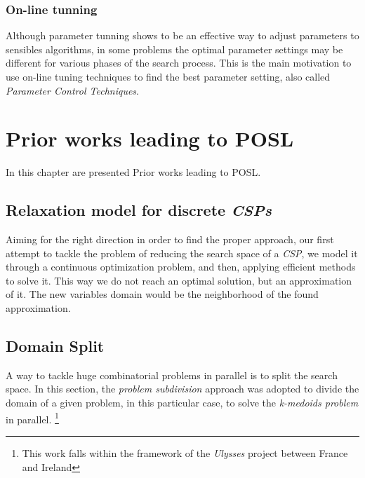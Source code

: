 \documentclass[a4paper]{book} %
\newcommand{\posl}{{\sc POSL}}
\newcommand{\csp}{\textit{CSP}}
\newcommand{\csps}{\csp\textit{s}}
\begin{document}
\subsection{On-line tunning}

Although parameter tunning shows to be an effective way to adjust parameters to sensibles algorithms, in some problems the optimal parameter settings may be different for various phases of the search process. This is the main motivation to use on-line tuning techniques to find the best parameter setting, also called \textit{Parameter Control Techniques}.



\chapter{Prior works leading to \posl}

In this chapter are presented Prior works leading to \posl. 

\section{Relaxation model for discrete \csps}
\label{sec:relaxation}

Aiming for the right direction in order to find the proper approach, our first attempt to tackle the problem of reducing the search space of a \csp, we model it through a continuous optimization problem, and then, applying efficient methods to solve it. This way we do not reach an optimal solution, but an approximation of it. The new variables domain would be the neighborhood of the found approximation.

\section{Domain Split}
\label{sec:split}

A way to tackle huge combinatorial problems in parallel is to split the search space. In this section, the {\it problem subdivision} approach was adopted to divide the domain of a given problem, in this particular case, to solve the {\it k-medoids problem} in parallel. \footnote{This work falls within the framework of the \textit{Ulysses} project between France and Ireland}
\end{document}
